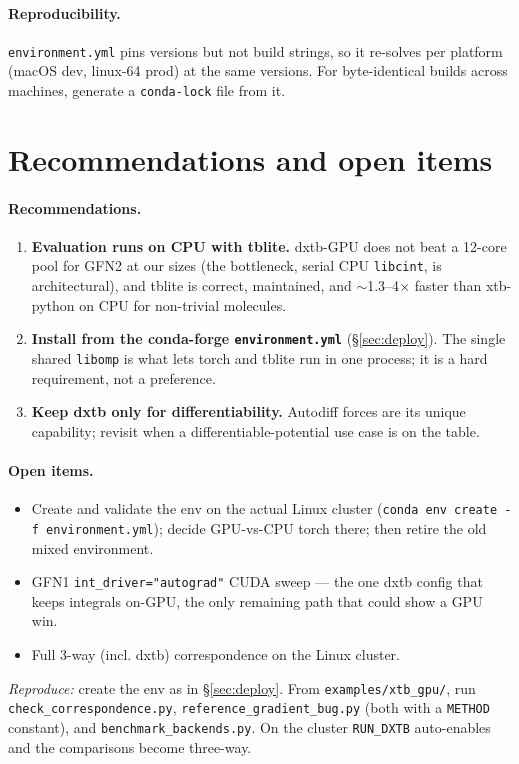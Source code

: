 \documentclass[11pt]{article}
\newcommand{\code}[1]{\texttt{#1}}
\begin{document}
\paragraph{Reproducibility.} \code{environment.yml} pins versions but not build
strings, so it re-solves per platform (macOS dev, linux-64 prod) at the same
versions. For byte-identical builds across machines, generate a \code{conda-lock}
file from it.

\section{Recommendations and open items}

\paragraph{Recommendations.}
\begin{enumerate}
  \item \textbf{Evaluation runs on CPU with tblite.} dxtb-GPU does not beat a
  12-core pool for GFN2 at our sizes (the bottleneck, serial CPU \code{libcint},
  is architectural), and tblite is correct, maintained, and $\sim$1.3--4$\times$
  faster than xtb-python on CPU for non-trivial molecules.
  \item \textbf{Install from the conda-forge \code{environment.yml}}
  (\S\ref{sec:deploy}). The single shared \code{libomp} is what lets torch and
  tblite run in one process; it is a hard requirement, not a preference.
  \item \textbf{Keep dxtb only for differentiability.} Autodiff forces are its
  unique capability; revisit when a differentiable-potential use case is on the
  table.
\end{enumerate}

\paragraph{Open items.}
\begin{itemize}
  \item Create and validate the env on the actual Linux cluster
  (\code{conda env create -f environment.yml}); decide GPU-vs-CPU torch there;
  then retire the old mixed environment.
  \item GFN1 \code{int\_driver="autograd"} CUDA sweep --- the one dxtb config that
  keeps integrals on-GPU, the only remaining path that could show a GPU win.
  \item Full 3-way (incl. dxtb) correspondence on the Linux cluster.
\end{itemize}

\bigskip\noindent\emph{Reproduce:} create the env as in \S\ref{sec:deploy}. From
\code{examples/xtb\_gpu/}, run \code{check\_correspondence.py},
\code{reference\_gradient\_bug.py} (both with a \code{METHOD} constant), and
\code{benchmark\_backends.py}. On the cluster \code{RUN\_DXTB} auto-enables and the
comparisons become three-way.
\end{document}
